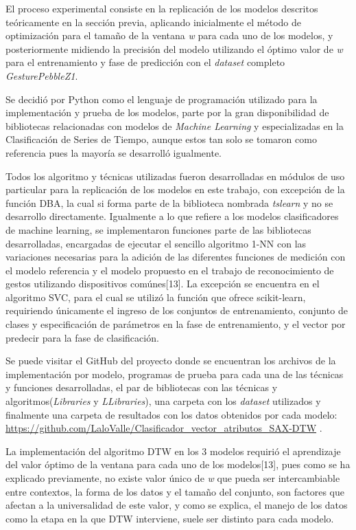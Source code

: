 \hfill\break
\justifying
El proceso experimental consiste en la replicación de los modelos descritos teóricamente en la sección previa, aplicando inicialmente el método de optimización para el tamaño de la ventana \textit{w} para cada uno de los modelos, y posteriormente midiendo la precisión del modelo utilizando el óptimo valor de \textit{w} para el entrenamiento y fase de predicción con el \textit{dataset} completo \textit{GesturePebbleZ1}.

\hfill\break
\justifying
Se decidió por Python como el lenguaje de programación utilizado para la implementación y prueba de los modelos, parte por la gran disponibilidad de bibliotecas relacionadas con modelos de \textit{Machine Learning} y especializadas en la Clasificación de Series de Tiempo, aunque estos tan solo se tomaron como referencia pues la mayoría se desarrolló igualmente.

\hfill\break
\justifying
Todos los algoritmo y técnicas utilizadas fueron desarrolladas en módulos de uso particular para la replicación de los modelos en este trabajo, con excepción de la función DBA, la cual si forma parte de la biblioteca nombrada \textit{tslearn} y no se desarrollo directamente. Igualmente a lo que refiere a los modelos clasificadores de machine learning, se implementaron funciones parte de las bibliotecas desarrolladas, encargadas de ejecutar el sencillo algoritmo 1-NN con las variaciones necesarias para la adición de las diferentes funciones de medición con el modelo referencia y el modelo propuesto en el trabajo de reconocimiento de gestos utilizando dispositivos comúnes[13]. La excepción se encuentra en el algoritmo SVC, para el cual se utilizó la función que ofrece scikit-learn, requiriendo únicamente el ingreso de los conjuntos de entrenamiento, conjunto de clases y especificación de parámetros en la fase de entrenamiento, y el vector por predecir para la fase de clasificación.

\hfill\break
\justifying
Se puede visitar el GitHub del proyecto donde se encuentran los archivos de la implementación por modelo, programas de prueba para cada una de las técnicas y funciones desarrolladas, el par de bibliotecas con las técnicas y algoritmos(\textit{Libraries} y \textit{LLibraries}), una carpeta con los \textit{dataset} utilizados y finalmente una carpeta de resultados con los datos obtenidos por cada modelo: {\small \underline{https://github.com/LaloValle/Clasificador\_vector\_atributos\_SAX-DTW}} .

\hfill\break
\justifying
La implementación del algoritmo DTW en los 3 modelos requirió el aprendizaje del valor óptimo de la ventana para cada uno de los modelos[13], pues como se ha explicado previamente, no existe valor único de \textit{w} que pueda ser intercambiable entre contextos, la forma de los datos y el tamaño del conjunto, son factores que afectan a la universalidad de este valor, y como se explica, el manejo de los datos como la etapa en la que DTW interviene, suele ser distinto para cada modelo.


